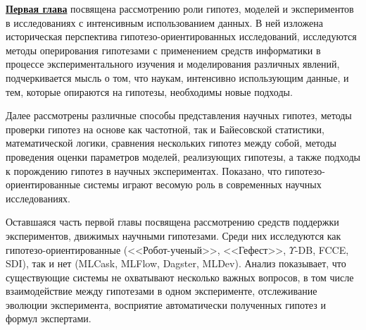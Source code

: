 

\underline{\textbf{Первая глава}} посвящена рассмотрению роли гипотез, моделей и экспериментов в исследованиях 
с интенсивным использованием данных. В ней изложена историческая перспектива гипотезо-ориентированных исследований,
исследуются методы оперирования гипотезами с применением средств информатики в процессе экспериментального 
изучения и моделирования различных явлений, подчеркивается мысль о том, что наукам, интенсивно использующим данные, 
и тем, которые опираются на гипотезы, необходимы новые подходы.

Далее рассмотрены различные способы представления научных гипотез, методы проверки гипотез на основе как частотной,
так и Байесовской статистики, математической логики,
сравнения нескольких гипотез между собой, методы проведения оценки параметров моделей, реализующих гипотезы, а также 
подходы к порождению гипотез в научных экспериментах. Показано, что гипотезо-ориентированные системы играют весомую 
роль в современных научных исследованиях. 

Оставшаяся часть первой главы посвящена рассмотрению средств поддержки экспериментов, движимых научными гипотезами. 
Среди них исследуются как гипотезо-ориентированные (<<Робот-ученый>>, <<Гефест>>, $\Upsilon$-DB, FCCE, SDI), 
так и нет (MLCask, MLFlow, Dagster, MLDev). Анализ показывает, 
что существующие системы не охватывают несколько важных вопросов, в том числе взаимодействие между гипотезами в 
одном эксперименте, отслеживание эволюции эксперимента, восприятие автоматически полученных гипотез и формул экспертами.

